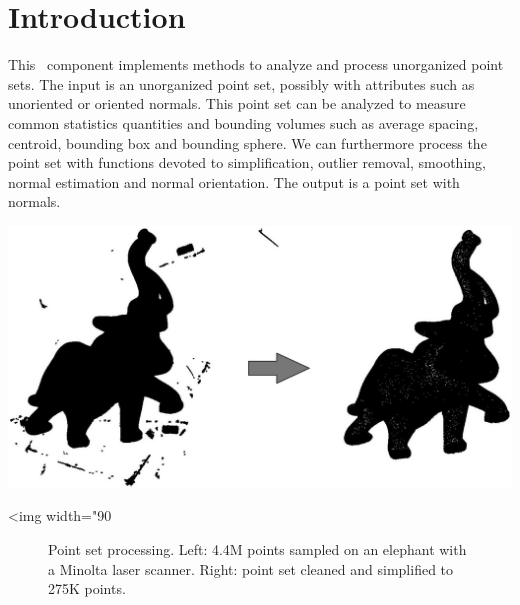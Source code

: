 \section{Introduction}

This \cgal\ component implements methods to analyze and process unorganized point sets.
The input is an unorganized point set, possibly with attributes such as unoriented or oriented normals.
This point set can be analyzed to measure common statistics quantities and bounding volumes such as average spacing, centroid, bounding box and bounding sphere.
We can furthermore process the point set with functions devoted to simplification, outlier removal, smoothing, normal estimation and normal orientation.
The output is a point set with normals.

\begin{center}
    \label{Point_set_processing_3-fig-introduction}
    \begin{ccTexOnly}
        \includegraphics[width=1.0\textwidth]{Point_set_processing_3/introduction} %
    \end{ccTexOnly}
    \begin{ccHtmlOnly}
        <img width="90%
    \end{ccHtmlOnly}
    \begin{figure}[h]
        \caption{Point set processing.
                 Left: 4.4M points sampled on an elephant with a Minolta laser scanner.
                 Right: point set cleaned and simplified to 275K points.}
    \end{figure}
\end{center}


